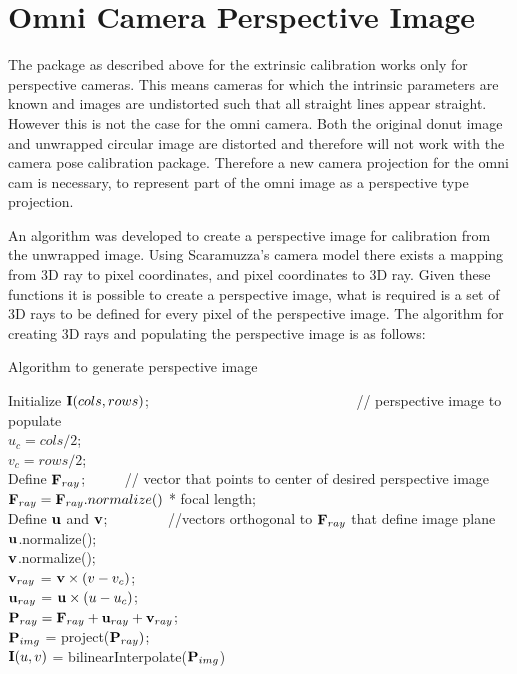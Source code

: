 \section{Omni Camera Perspective Image}
\label{sec:perspective_from_donut}
The package as described above for the extrinsic calibration works only for perspective cameras. This means cameras for which the intrinsic parameters are known and images are undistorted such that all straight lines appear straight.  However this is not the case for the omni camera.  Both the original donut image and unwrapped circular image are distorted and therefore will not work with the camera pose calibration package.  Therefore a new camera projection for the omni cam is necessary, to represent part of the omni image as a perspective type projection.

An algorithm was developed to create a perspective image for calibration from the unwrapped image.  Using Scaramuzza's camera model\cite{scaramuzza_06} there exists a  mapping from 3D ray to pixel coordinates, and pixel coordinates to 3D ray.  Given these functions it is possible to create a perspective image, what is required is a set of 3D rays to be defined for every pixel of the perspective image.  The algorithm for creating 3D rays and populating the perspective image is as follows:

\begin{algorithm}[h!]
 \caption{Algorithm to generate perspective image}
 Initialize $\mathbf I(cols,rows)$; \ \ \ \ \ \ \ \ \ \ \ \ \ \ \ \ \ \ \ \ \ \ \ \ \ \ \ \ \ 
 // perspective image to populate \\
 $u_c = cols/2$;  \\
 $v_c = rows/2$;  \\
 Define $\mathbf F_{ray}$; \ \ \ \ \ 
 // vector that points to center of desired perspective image \\
 $\mathbf F_{ray} = \mathbf F_{ray}.normalize()$ * focal length; \ \ \ \ \ \ \ \ \ \ \ \ \ \ \ \ \\
 Define $\mathbf u$ and $\mathbf v$; \ \ \ \ \ \ \ \ 
 //vectors orthogonal to $\mathbf F_{ray}$ that define image plane \\
 $\mathbf u$.normalize(); \\
 $\mathbf v$.normalize(); \\
 \For{v = 0 to rows}
 {
   $\mathbf v_{ray}$ = $\mathbf v \times (v - v_c)$; \\
   {
     $\mathbf u_{ray}$ = $\mathbf u \times (u - u_c)$; \\
     $\mathbf P_{ray} = \mathbf F_{ray} + \mathbf u_{ray} + \mathbf v_{ray}$; \\
     $\mathbf P_{img}$ = project($\mathbf P_{ray})$; \\
     $\mathbf I(u,v)$ = bilinearInterpolate($\mathbf P_{img}$)
   }
 }
\end{algorithm}

